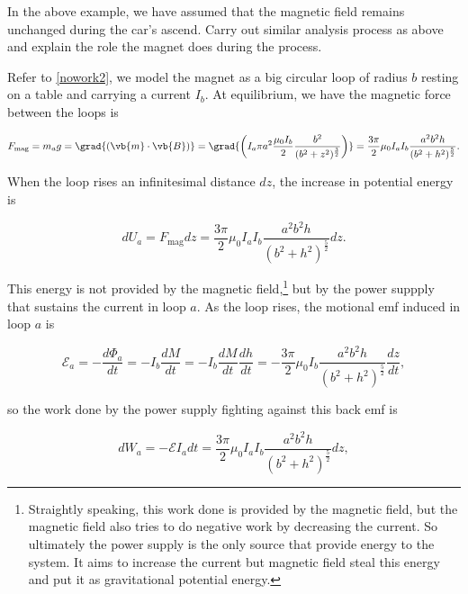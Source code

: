 \documentclass[english,a4paper,12pt]{report}
\begin{document}

{In the above example, we have assumed that the magnetic field remains unchanged during the car's ascend. Carry out similar analysis process as above and explain the role the magnet does during the process.}
{Refer to \cref{nowork2}, we model the magnet as a big circular loop of radius \(b\) resting on a table and carrying a current \(I_{b} \). At equilibrium, we have the magnetic force between the loops is 

\begin{equation}
    F_{\text{mag} } = m_{a}g  = \grad{(\vb{m} \cdot \vb{B} )} = \grad{\left( I_{a}\pi a^2 \frac{\mu_0 I_{b} }{2} \frac{b^2}{(b^2+z^2)^{\frac{3}{2} } }    \right)} = \frac{3\pi }{2} \mu_0 I_{a}I_{b}\frac{a^2b^2h}{(b^2+h^2)^{\frac{5}{2} } } .      
\end{equation}

When the loop rises an infinitesimal distance \(dz\), the increase in potential energy is 

\begin{equation}
    dU_{a}  = F_{\text{mag} } dz = \frac{3\pi }{2} \mu_0 I_{a}I_{b}\frac{a^2b^2h}{(b^2+h^2)^{\frac{5}{2} } }dz.     
\end{equation}

This energy is not provided by the magnetic field,\footnote{Straightly speaking, this work done is provided by the magnetic field, but the magnetic field also tries to do negative work by decreasing the current. So ultimately the power supply is the only source that provide energy to the system. It aims to increase the current but magnetic field steal this energy and put it as gravitational potential energy.} but by the power suppply that sustains the current in loop \(a\). As the loop rises, the motional emf induced in loop \(a\) is 

\begin{equation}
    \mathcal{E}_{a} = - \frac{d\Phi _{a} }{dt} = -I_{b} \frac{dM}{dt} = -I_{b}\frac{dM}{dt}\frac{dh}{dt} = -\frac{3\pi }{2} \mu_0 I_{b} \frac{a^2b^2h}{(b^2+h^2)^{\frac{5}{2} } }\frac{dz}{dt},          
\end{equation}

so the work done by the power supply fighting against this back emf is 

\begin{equation}
    dW_{a}  = -\mathcal{E}I_{a}dt = \frac{3\pi }{2}\mu_0 I_{a}I_{b}\frac{a^2b^2h}{(b^2+h^2)^{\frac{5}{2} } }dz,     
\end{equation}

}
\end{document}
